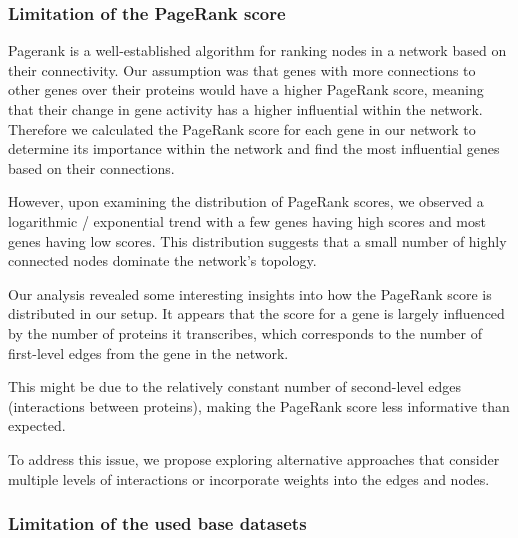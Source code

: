 \subsubsection*{Limitation of the PageRank score} \label{subsubsec:limit_pagerank}
Pagerank is a well-established algorithm for ranking nodes in a network based on their connectivity.
Our assumption was that genes with more connections to other genes over their proteins would have a higher PageRank score,
meaning that their change in gene activity has a higher influential within the network.
Therefore we calculated the PageRank score for each gene in our network to determine its importance within the network
and find the most influential genes based on their connections.


However, upon examining the distribution of PageRank scores, we observed a logarithmic / exponential trend with a few genes having high scores and most genes having low scores.
This distribution suggests that a small number of highly connected nodes dominate the network's topology.


Our analysis revealed some interesting insights into how the PageRank score is distributed in our setup.
It appears that the score for a gene is largely influenced by the number of proteins it transcribes,
which corresponds to the number of first-level edges from the gene in the network.

This might be due to the relatively constant number of second-level edges (interactions between proteins),
making the PageRank score less informative than expected.

To address this issue, we propose exploring alternative approaches that consider multiple levels of interactions
or incorporate weights into the edges and nodes.


\subsubsection*{Limitation of the used base datasets} \label{subsubsec:limit_base_data}

